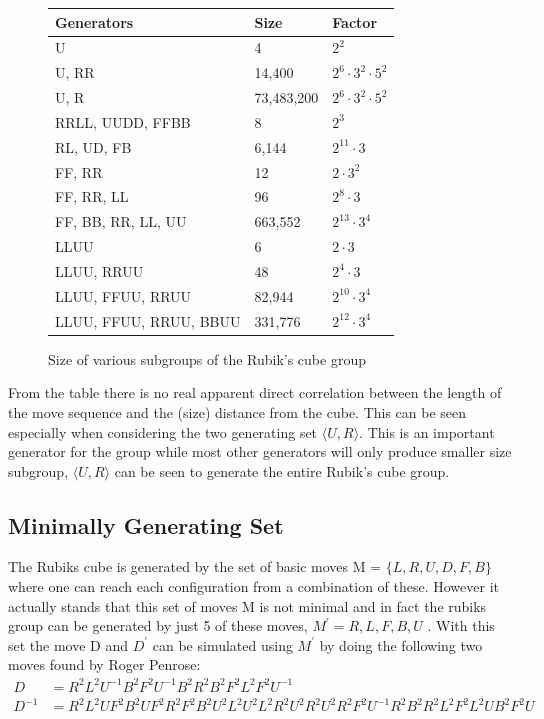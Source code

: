\documentclass{article}
\begin{document}
\begin{figure}[h]
\begin{center}
    \begin{tabular}{ | p{7cm} | p{2cm} | p{3cm}|}
    \hline
    Generators & Size & Factor \\ \hline
    U & 4 & $2^2$\\ \hline
    U, RR & 14,400 & $2^6 \cdot 3^2 \cdot 5^2$ \\ \hline
    U, R  & 73,483,200 &$2^6 \cdot 3^2 \cdot 5^2$\\ \hline
    RRLL, UUDD, FFBB & 8 & $2^3$ \\ \hline
    RL, UD, FB & 6,144 & $2^11 \cdot 3$\\ \hline
    FF, RR & 12 &$ 2 \cdot 3^2$\\ \hline
    FF, RR, LL & 96 &$ 2^8 \cdot 3$\\ \hline
	FF, BB, RR, LL, UU & 663,552 &$ 2^13 \cdot 3^4$\\ \hline
    LLUU & 6 & $2 \cdot 3$\\ \hline
    LLUU, RRUU & 48 &$ 2^4 \cdot 3 $\\ \hline
    LLUU, FFUU, RRUU & 82,944 &$ 2^{10} \cdot 3^4$\\ \hline
    LLUU, FFUU, RRUU, BBUU & 331,776 &$ 2^{12} \cdot 3^4 $\\ \hline

    \end{tabular}
\end{center}
    \caption{Size of various subgroups of the Rubik's cube group}
    \label{fig:movestable}
\end{figure}
From the table there is no real apparent direct correlation between the length of the move sequence and the (size) distance from the cube. This can be seen especially when considering the two generating set $\langle U,R\rangle$. This is an important generator for the group while most other generators will only produce smaller size subgroup, $\langle U,R\rangle$ can be seen to generate the entire Rubik's cube group.

\subsection{Minimally Generating Set}

The Rubiks cube is generated by the set of basic moves M = $\{L,R,U,D,F,B\}$ where one can reach each configuration from a combination of these. However it actually stands that this set of moves M is not minimal and in fact the rubiks group can be generated by just 5 of these moves, $M^{'} = R,L,F,B,U$ \cite{bandelow2012inside}. With this set the move D and $D^{'}$ can be simulated using $M^{'}$ by doing the following two moves found by Roger Penrose:
\begin{align*}
D &= R^{2}L^{2}U^{-1}B^{2}F^{2}U^{-1}B^{2}R^{2}B^{2}F^{2}L^{2}F^{2}U^{-1} \\
D^{-1} &= R^{2}L^{2}UF^{2}B^{2}UF^{2}R^{2}F^{2}B^{2}U^{2}L^{2}U^{2}L^{2}R^{2}U^{2}R^{2}U^{2}R^{2}F^{2}U^{-1}R^{2}B^{2}R^{2}L^{2}F^{2}L^{2}UB^{2}F^{2}U
\end{align*}
\end{document}
